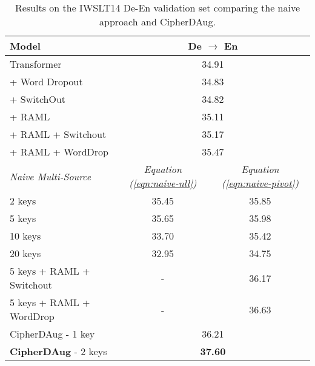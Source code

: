 \documentclass[11pt]{article}
\begin{document}
\begin{table}[ht]
\centering
\small
\begin{tabular}{lcc}
\toprule
 \textbf{Model} & \multicolumn{2}{c}{\textbf{De $\rightarrow$ En}} \\ \midrule
 Transformer & \multicolumn{2}{c}{34.91} \\
 \midrule
 + Word Dropout & \multicolumn{2}{c}{34.83} \\
 + SwitchOut & \multicolumn{2}{c}{34.82} \\
 + RAML & \multicolumn{2}{c}{35.11} \\
 + RAML + Switchout & \multicolumn{2}{c}{35.17} \\
 + RAML + WordDrop & \multicolumn{2}{c}{35.47} \\
 \midrule
 \scriptsize{\emph{Naive Multi-Source}} &  \scriptsize{\emph{Equation (\ref{eqn:naive-nll})}} & \scriptsize{\emph{Equation (\ref{eqn:naive-pivot})}} \\
 2 keys  & 35.45  & 35.85 \\ 
 5 keys  & 35.65 & 35.98 \\ 
 10 keys  & 33.70 & 35.42 \\ 
 20 keys & 32.95 & 34.75\\
 \midrule
 5 keys + RAML + Switchout & - & 36.17 \\
 5 keys + RAML + WordDrop & - & 36.63 \\ \midrule
 CipherDAug - 1 key & \multicolumn{2}{c}{36.21} \\
 \textbf{CipherDAug} - 2 keys & \multicolumn{2}{c}{\textbf{37.60}} \\
 \bottomrule 
 
\end{tabular}
\caption{Results on the IWSLT14 De-En validation set comparing the naive approach and CipherDAug.\footnotemark}\vspace{-1.5em}
\label{tab:naive}
\end{table}

\end{document}
